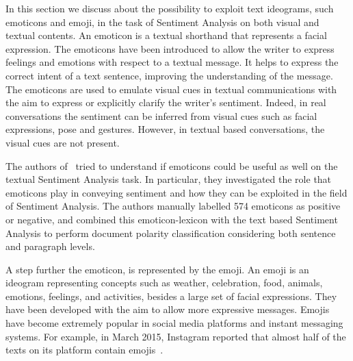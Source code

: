 In this section we discuss about the possibility to exploit text ideograms, such emoticons and emoji, in the task of Sentiment Analysis on both visual and textual contents.
An emoticon is a textual shorthand that represents a facial expression. The emoticons have been introduced to allow the writer to express feelings and emotions with respect to a textual message. It helps to express the correct intent of a text sentence, improving the understanding of the message.
The emoticons are used to emulate visual cues in textual communications with the aim to express or explicitly clarify the writer's sentiment.
Indeed, in real conversations the sentiment can be inferred from visual cues such as facial expressions, pose and gestures. However, in textual based conversations, the visual cues are not present. 

The authors of~\cite{hogenboom2013exploiting} tried to understand if emoticons could be useful as well on the textual Sentiment Analysis task.
In particular, they investigated the role that emoticons play in conveying sentiment and how they can be exploited in the field of Sentiment Analysis. The authors manually labelled 574 emoticons as positive or negative, and combined this emoticon-lexicon with the text based Sentiment Analysis to perform document polarity classification considering both sentence and paragraph levels.

A step further the emoticon, is represented by the emoji. An emoji is an ideogram representing concepts such as weather, celebration, food, animals, emotions, feelings, and activities, besides a large set of facial expressions.
They have been developed with the aim to allow more expressive messages. 
Emojis have become extremely popular in social media platforms and instant messaging systems. For example, in March 2015, Instagram  reported that almost half of the texts on its platform contain emojis~\cite{instagram2015}.

